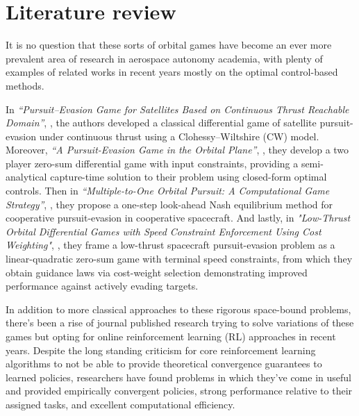 \chapter{Literature review}

It is no question that these sorts of orbital games have become an ever more prevalent area of research in aerospace autonomy academia, with plenty of examples of related works in recent years mostly on the optimal control-based methods.

In \textit{“Pursuit--Evasion Game for Satellites Based on Continuous Thrust Reachable Domain”}, \cite{gong2020continuousthrust}, the authors developed a classical differential game of satellite pursuit-evasion under continuous thrust using a Clohessy--Wiltshire (CW) model. Moreover, \textit{“A Pursuit-Evasion Game in the Orbital Plane”}, \cite{selvakumar2017orbitalplane}, they develop a two player zero-sum differential game with input constraints, providing a semi-analytical capture-time solution to their problem using closed-form optimal controls. Then in \textit{“Multiple-to-One Orbital Pursuit: A Computational Game Strategy”}, \cite{liu2025multipletoone}, they propose a one-step look-ahead Nash equilibrium method for cooperative pursuit-evasion in cooperative spacecraft. And lastly, in \textit{"Low-Thrust Orbital Differential Games with Speed Constraint Enforcement Using Cost Weighting"}, \cite{drucker2026lowthrustgames}, they frame a low-thrust spacecraft pursuit-evasion problem as a linear-quadratic zero-sum game with terminal speed constraints, from which they obtain guidance laws via cost-weight selection demonstrating improved performance against actively evading targets.


In addition to more classical approaches to these rigorous space-bound problems, there’s been a rise of journal published research trying to solve variations of these games but opting for online reinforcement learning (RL) approaches in recent years. Despite the long standing criticism for core reinforcement learning algorithms to not be able to provide theoretical convergence guarantees to learned policies, researchers have found problems in which they've come in useful and provided empirically convergent policies, strong performance relative to their assigned tasks, and excellent computational efficiency.


